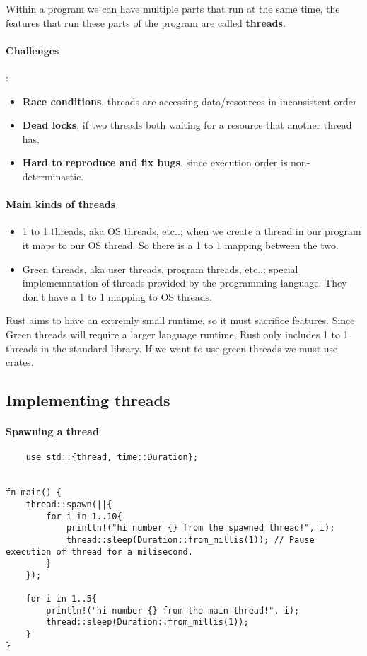 \begin{definition}
    Within a program we can have multiple parts that run at the same time, the features that run these parts of the program are called \textbf{threads}.
\end{definition}

\paragraph*{Challenges}:\begin{itemize}
    \item \textbf{Race conditions}, threads are accessing data/resources in inconsistent order
    \item \textbf{Dead locks}, if two threads both waiting for a resource that another thread has.
    \item \textbf{Hard to reproduce and fix bugs}, since execution order is non-determinastic. 
\end{itemize}

\paragraph*{Main kinds of threads}\begin{itemize}
    \item 1 to 1 threads, aka OS threads, etc..; when we create a thread in our program it maps to our OS thread. So there is a 1 to 1 mapping between the two.
    \item Green threads, aka user threads, program threads, etc..; special implememntation of threads provided by the programming language. They don't have a 1 to 1 mapping to OS threads.
\end{itemize}
Rust aims to have an extremly small runtime, so it must sacrifice features. Since Green threads will require a larger language runtime, Rust only includes 1 to 1 threads  in the standard library. If we want to use green threads we must use crates.

\subsection{Implementing threads}

\paragraph*{Spawning a thread}\begin{lstlisting}
    use std::{thread, time::Duration};


fn main() {
    thread::spawn(||{
        for i in 1..10{
            println!("hi number {} from the spawned thread!", i);
            thread::sleep(Duration::from_millis(1)); // Pause execution of thread for a milisecond.
        }
    });

    for i in 1..5{
        println!("hi number {} from the main thread!", i);
        thread::sleep(Duration::from_millis(1));
    }
}
\end{lstlisting}

